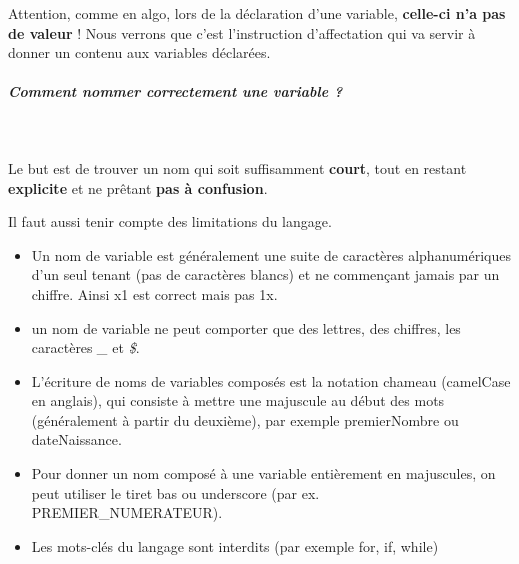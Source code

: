 \documentclass[11pt,a4paper]{article}
\begin{document}
          Attention, comme en algo, lors de la d\'eclaration d'une variable, \textbf{celle-ci n'a pas de valeur} ! 
          Nous verrons que c'est l'instruction d'affectation qui va servir \`a donner un contenu aux variables d\'eclar\'ees.
        
            \par
        
			
		\subparagraph{Comment nommer correctement une variable ?} 
		
					\textcolor{white}{.} \par
				
            \par
        
          Le but est de trouver un nom qui soit suffisamment \textbf{court}, 
          tout en restant \textbf{explicite} et ne pr\^etant \textbf{pas \`a confusion}.
        
            \par
        
          Il faut aussi tenir compte des limitations du langage.
          
					\begin{itemize}
				
			\item 
            Un nom de variable est g\'en\'eralement une suite de caract\`eres alphanum\'eriques d'un
            seul tenant (pas de caract\`eres blancs) et ne commen\c cant jamais par un chiffre. Ainsi
            x1 est correct mais pas 1x.
            
			\item 
            un nom de variable ne peut comporter que des lettres, des chiffres, les caract\`eres \textit{\_} et \textit{\$}.
            
			\item 
            L'\'ecriture de noms de variables compos\'es
            est la notation \guillemotleft  chameau \guillemotright  (camelCase en anglais), qui consiste \`a mettre une majuscule
            au d\'ebut des mots (g\'en\'eralement \`a partir du deuxi\`eme), par exemple premierNombre
            ou dateNaissance.
            
			\item 
            Pour donner un nom compos\'e \`a une variable enti\`erement en majuscules, on peut utiliser le \guillemotleft  tiret bas \guillemotright  ou underscore 
            (par ex. PREMIER\_NUMERATEUR).
            
			\item 
            Les mots-cl\'es du langage sont interdits (par exemple for, if, while)
            
					\end{itemize}
				
\end{document}
